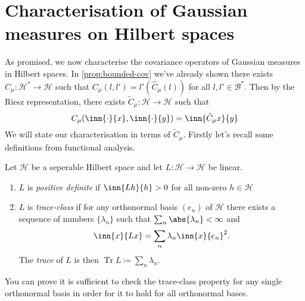 \documentclass[fontsize=12pt, DIV=10]{scrreprt}
\theoremstyle{remark}
\newcommand{\defeq}{\coloneqq}
\newcommand{\calB}{\mathcal B}
\newcommand{\calH}{\mathcal H}
\DeclareMathOperator{\tr}{Tr}
\begin{document}
\section{Characterisation of Gaussian measures on Hilbert spaces}

As promised, we now characterise the covariance operators of Gaussian measures in Hilbert spaces. In \vref{prop:bounded-cov} we've already shown there exists $\hat{C}_{\mu}: \calH^* \to \calH$ such that $C_{\mu}(l, l') = l'(\hat{C}_{\mu}(l))$ for all $l, l' \in \calB^*$. Then by the Riesz representation, there exists $\tilde{C}_{\mu}: \calH \to \calH$ such that
\begin{equation}
	C_{\mu}(\inn{\cdot}{x}, \inn{\cdot}{y}) = \inn{\tilde{C}_{\mu}x}{y}
\end{equation}
We will state our characterisation in terms of $\tilde{C}_{\mu}$. Firstly let's recall some definitions from functional analysis.
\begin{defn}
	Let $\calH$ be a seperable Hilbert space and let $L: \calH \to \calH$ be linear.
	\begin{enumerate}
		\item $L$ is \emph{positive definite} if $\inn{L h}{h} > 0$ for all non-zero $h \in \calH$
		\item $L$ is \emph{trace-class} if for any orthonormal basis $(e_n)$ of $\calH$ there exists a sequence of numbers $\{\lambda_n\}$ such that $\sum_n \abs{\lambda_n} < \infty$ and
			\begin{equation}
				\inn{x}{Lx} = \sum_n \lambda_n \inn{x}{e_n}^2.
			\end{equation}
			The \emph{trace} of $L$ is then $\tr L \defeq \sum_n \lambda _n$.
	\end{enumerate}
\end{defn}
You can prove it is sufficient to check the trace-class property for any single orthonormal basis in order for it to hold for all orthonormal bases.
\end{document}
